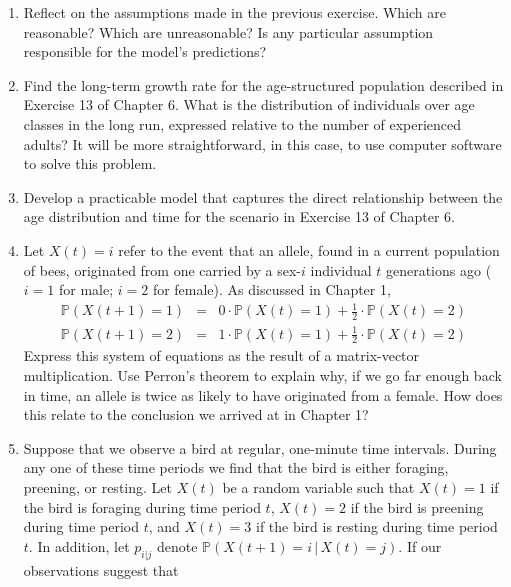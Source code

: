 \documentclass[11pt]{article}
\begin{document}
\begin{enumerate}
\begin{enumerate}
        Devise a model for that expresses an explicit relationship between ${x_1(t)\brack x_2(t)}$ and time. Your model should predictions about population size for any time $t$ to be made without having to carry out numerous matrix-vector multiplication.
      \item Reflect on the assumptions made in the previous exercise. Which are reasonable? Which are unreasonable? Is any particular assumption responsible for the model's predictions?
      \item Find the long-term growth rate for the age-structured population described in Exercise 13 of Chapter 6. What is the distribution of individuals over age classes in the long run, expressed relative to the number of experienced adults? It will be more straightforward, in this case, to use computer software to solve this problem.
      \item Develop a practicable model that captures the direct relationship between the age distribution and time for the scenario in Exercise 13 of Chapter 6.
      \item Let $X(t) = i$ refer to the event that an allele, found in a current population of bees, originated from one carried by a sex-$i$ individual $t$ generations ago ($i=1$ for male; $i=2$ for female). As discussed in Chapter 1,
        \[
          \begin{array}{lcl}
            \mathbb{P}(X(t+1) = 1) 
                        &=& 
                        0 \cdot \mathbb{P}(X(t)=1) 
                        +
                        \frac{1}{2} \cdot \mathbb{P}(X(t)=2)
                        \\
                        \mathbb{P}(X(t+1) = 2)
                        &=&
                        1 \cdot \mathbb{P}(X(t) = 1)
                        +
                        \frac{1}{2}\cdot \mathbb{P}(X(t) = 2)
          \end{array}
        \]
        Express this system of equations as the result of a matrix-vector multiplication. Use Perron's theorem to explain why, if we go far enough back in time, an allele is twice as likely to have originated from a female. How does this relate to the conclusion we arrived at in Chapter 1?
      \item Suppose that we observe a bird at regular, one-minute time intervals. During any one of these time periods we find that the bird is either foraging, preening, or resting. Let $X(t)$ be a random variable such that $X(t) = 1$ if the bird is foraging during time period $t$, $X(t) = 2$ if the bird is preening during time period $t$, and $X(t)=3$ if the bird is resting during time period $t$. In addition, let $p_{i|j}$ denote $\mathbb{P}( X(t+1) = i \, |\, X(t) = j )$. If our observations suggest that 

\end{enumerate}
\end{enumerate}
\end{document}
